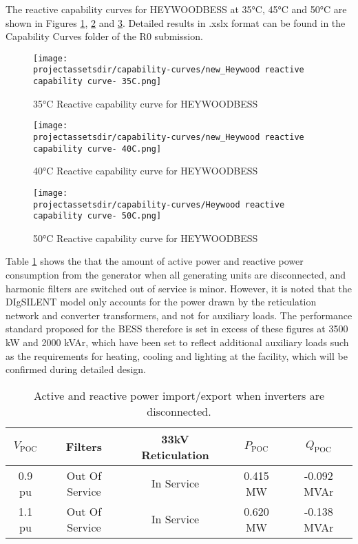 \documentclass{../grid-link-report}
\newcommand{\projectassetsdir}{../project-assets}
\begin{document}
	The reactive capability curves for HEYWOODBESS at 35°C, 45°C and 50°C are shown in Figures \ref{fig:pq-curve-35degC}, \ref{fig:pq-curve-40degC} and \ref{fig:pq-curve-50degC}. Detailed results in .xslx format can be found in the Capability Curves folder of the R0 submission.
	
	\begin{figure}[H]
		\centering
		\texttt{[image: \\projectassetsdir/capability-curves/new\_Heywood reactive capability curve- 35C.png]}
		\caption{35°C Reactive capability curve for HEYWOODBESS}
		\label{fig:pq-curve-35degC}
	\end{figure}
	
	\begin{figure}[H]
		\centering
		\texttt{[image: \\projectassetsdir/capability-curves/new\_Heywood reactive capability curve- 40C.png]}
		\caption{40°C Reactive capability curve for HEYWOODBESS}
		\label{fig:pq-curve-40degC}
	\end{figure}
	
	\begin{figure}[H]
		\centering
		\texttt{[image: \\projectassetsdir/capability-curves/Heywood reactive capability curve- 50C.png]}
		\caption{50°C Reactive capability curve for HEYWOODBESS}
		\label{fig:pq-curve-50degC}
	\end{figure}
	
	Table \ref{tab:s5251-power-draw-when-inverters-disconnected} shows the that the amount of active power and reactive power consumption from the generator when all generating units are disconnected, and harmonic filters are switched out of service is minor. However, it is noted that the DIgSILENT model only accounts for the power drawn by the reticulation network and converter transformers, and not for auxiliary loads.  The performance standard proposed for the BESS therefore is set in excess of these figures at 3500 kW and 2000 kVAr, which have been set to reflect additional auxiliary loads such as the requirements for heating, cooling and lighting at the facility, which will be confirmed during detailed design.

	\begin{table}[H]
		\centering
		\begin{tabular}{|c|c|c|c|c|}
			\hline
			$V_{\mathrm{POC}}$ & Filters & 33kV Reticulation & $P_{\mathrm{POC}}$ & $Q_{\mathrm{POC}}$  \\ \hline
			0.9 pu & Out Of Service & In Service & 0.415 MW & -0.092 MVAr \\ \hline
			1.1 pu & Out Of Service & In Service & 0.620 MW & -0.138 MVAr \\ \hline
		\end{tabular}
		\caption{Active and reactive power import/export when inverters are disconnected.}
		\label{tab:s5251-power-draw-when-inverters-disconnected}
	\end{table}
\end{document}
